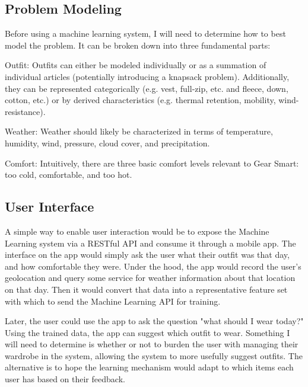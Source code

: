 \subsection{Problem Modeling}
Before using a machine learning system, I will need to determine how to best model the problem. It can be broken down into three fundamental parts:

\begin{description}
  \item{Outfit:} Outfits can either be modeled individually or as a summation of individual articles (potentially introducing
  a knapsack problem). Additionally, they can be represented categorically (e.g. vest, full-zip, etc. and fleece, down, cotton, etc.)
  or by derived characteristics (e.g. thermal retention, mobility, wind-resistance).
  \item{Weather:} Weather should likely be characterized in terms of temperature, humidity, wind, pressure, 
  cloud cover, and precipitation.
  \item{Comfort:} Intuitively, there are three basic comfort levels relevant to Gear Smart: too cold, comfortable, and too hot.
\end{description}

\subsection{User Interface}
A simple way to enable user interaction would be to expose the Machine Learning system via a RESTful API and consume it
through a mobile app. The interface on the app would simply ask the user what their outfit was that day, and how comfortable
they were. Under the hood, the app would record the user's geolocation and query some service for weather information 
about that location on that day. Then it would convert that data into a representative feature set with which to send
the Machine Learning API for training.

Later, the user could use the app to ask the question "what should I wear today?" Using the trained data, the app can
suggest which outfit to wear. Something I will need to determine is whether or not to burden the user with managing 
their wardrobe in the system, allowing the system to more usefully suggest outfits. The alternative is to hope the
learning mechanism would adapt to which items each user has based on their feedback.
